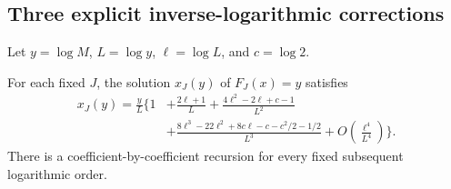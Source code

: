 \subsection{Three explicit inverse-logarithmic corrections}
Let $y=\log M$, $L=\log y$, $\ell=\log L$, and $c=\log2$.
\begin{theorem}\label{sfh:thm:reverse}
For each fixed $J$, the solution $x_J(y)$ of $F_J(x)=y$ satisfies
\begin{align}\label{sfh:eq:reverse}
 x_J(y)=\frac yL\bigg\{1&+\frac{2\ell+1}{L}
 +\frac{4\ell^2-2\ell+c-1}{L^2}\\[-3pt]
 &+\frac{8\ell^3-22\ell^2+8c\ell-c-c^2/2-1/2}{L^3}
 +O\left(\frac{\ell^4}{L^4}\right)\bigg\}.\nonumber
\end{align}
There is a coefficient-by-coefficient recursion for every fixed subsequent logarithmic order.
\end{theorem}
